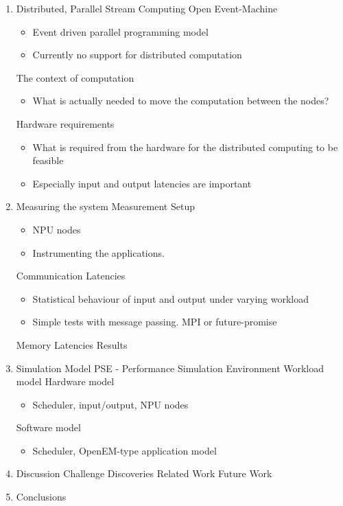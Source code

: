 \begin{enumerate}
\item Distributed, Parallel Stream Computing
  \subitem Open Event-Machine
  \begin{itemize}[leftmargin=45px]
    \item Event driven parallel programming model
    \item Currently no support for distributed computation
  \end{itemize}
  \subitem The context of computation
  \begin{itemize}[leftmargin=45px]
    \item What is actually needed to move the computation between the nodes?
  \end{itemize}
  \subitem Hardware requirements
  \begin{itemize}[leftmargin=45px]
    \item What is required from the hardware for the distributed computing to be feasible
    \item Especially input and output latencies are important
  \end{itemize}

\item Measuring the system
  \subitem Measurement Setup
  \begin{itemize}[leftmargin=45px]
    \item NPU nodes
    \item Instrumenting the applications.
  \end{itemize}
  \subitem Communication Latencies
  \begin{itemize}[leftmargin=45px]
    \item Statistical behaviour of input and output under varying workload
    \item Simple tests with message passing. MPI or future-promise
  \end{itemize}
  \subitem Memory Latencies
  \subitem Results

\item Simulation Model
  \subitem PSE - Performance Simulation Environment
  \subitem Workload model
  \subitem Hardware model
  \begin{itemize}[leftmargin=45px]
    \item Scheduler, input/output, NPU nodes
  \end{itemize}
  \subitem Software model
  \begin{itemize}[leftmargin=45px]
    \item Scheduler, OpenEM-type application model
  \end{itemize}

\item Discussion
  \subitem Challenge
  \subitem Discoveries
  \subitem Related Work
  \subitem Future Work

\item Conclusions
\end{enumerate}

